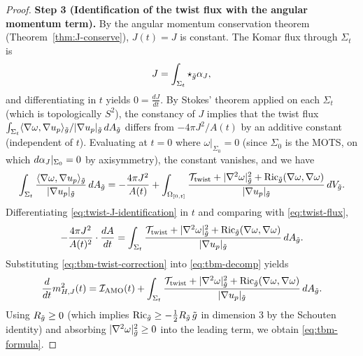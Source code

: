 \begin{proof}
\textbf{Step 3 (Identification of the twist flux with the angular momentum term).} By the angular momentum conservation theorem (Theorem~\ref{thm:J-conserve}), $J(t) = J$ is constant. The Komar flux through $\Sigma_t$ is
\begin{equation}
J = \int_{\Sigma_t} \star_{\tilde{g}} \alpha_J,
\end{equation}
and differentiating in $t$ yields $0 = \tfrac{dJ}{dt}$. By Stokes' theorem applied on each $\Sigma_t$ (which is topologically $S^2$), the constancy of $J$ implies that the twist flux $\int_{\Sigma_t} \langle \nabla \omega, \nabla u_p\rangle_{\tilde{g}}/|\nabla u_p|_{\tilde{g}} \, dA_{\tilde{g}}$ differs from $-4\pi J^2/A(t)$ by an additive constant (independent of $t$). Evaluating at $t = 0$ where $\omega|_{\Sigma_0} = 0$ (since $\Sigma_0$ is the MOTS, on which $d\alpha_J|_{\Sigma_0} = 0$ by axisymmetry), the constant vanishes, and we have
\begin{equation}\label{eq:twist-J-identification}
\int_{\Sigma_t} \frac{\langle \nabla \omega, \nabla u_p\rangle_{\tilde{g}}}{|\nabla u_p|_{\tilde{g}}} \, dA_{\tilde{g}} = -\frac{4\pi J^2}{A(t)} + \int_{\Omega_{[0,t]}} \frac{\mathcal{T}_{\mathrm{twist}} + |\nabla^2 \omega|_{\tilde{g}}^2 + \mathrm{Ric}_{\tilde{g}}(\nabla \omega, \nabla \omega)}{|\nabla u_p|_{\tilde{g}}} \, dV_{\tilde{g}}.
\end{equation}
Differentiating \eqref{eq:twist-J-identification} in $t$ and comparing with \eqref{eq:twist-flux},
\begin{equation}\label{eq:tbm-twist-correction}
-\frac{4\pi J^2}{A(t)^2} \cdot \frac{dA}{dt} = \int_{\Sigma_t} \frac{\mathcal{T}_{\mathrm{twist}} + |\nabla^2 \omega|_{\tilde{g}}^2 + \mathrm{Ric}_{\tilde{g}}(\nabla \omega, \nabla \omega)}{|\nabla u_p|_{\tilde{g}}} \, dA_{\tilde{g}}.
\end{equation}
Substituting \eqref{eq:tbm-twist-correction} into \eqref{eq:tbm-decomp} yields
\begin{equation}
\frac{d}{dt} m_{H,J}^2(t) = \mathcal{I}_{\mathrm{AMO}}(t) + \int_{\Sigma_t} \frac{\mathcal{T}_{\mathrm{twist}} + |\nabla^2 \omega|_{\tilde{g}}^2 + \mathrm{Ric}_{\tilde{g}}(\nabla \omega, \nabla \omega)}{|\nabla u_p|_{\tilde{g}}} \, dA_{\tilde{g}}.
\end{equation}
Using $R_{\tilde{g}} \geq 0$ (which implies $\mathrm{Ric}_{\tilde{g}} \geq -\tfrac{1}{2} R_{\tilde{g}} \, \tilde{g}$ in dimension 3 by the Schouten identity) and absorbing $|\nabla^2 \omega|_{\tilde{g}}^2 \geq 0$ into the leading term, we obtain \eqref{eq:tbm-formula}.


\end{proof}
